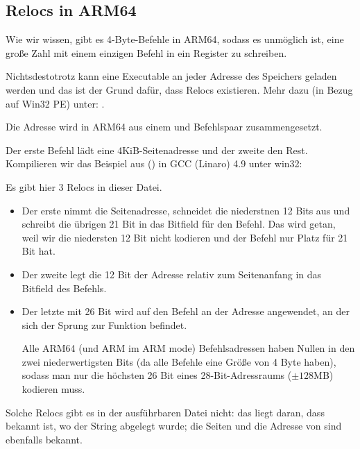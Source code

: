 \newcommand{\ARMELF}{\InSqBrackets{\emph{ELF für die ARM 64-Bit-Architektur (AArch64)}, (2013)}\footnote{\AlsoAvailableAs
\url{http://infocenter.arm.com/help/topic/com.arm.doc.ihi0056b/IHI0056B_aaelf64.pdf}}}

\subsection{Relocs in ARM64}
\label{ARM64_relocs}
Wie wir wissen, gibt es 4-Byte-Befehle in ARM64, sodass es unmöglich ist, eine große Zahl mit einem einzigen Befehl in
ein Register zu schreiben.

Nichtsdestotrotz kann eine Executable an jeder Adresse des Speichers geladen werden und das ist der Grund dafür, dass
Relocs existieren. Mehr dazu (in Bezug auf Win32 PE) unter: .

Die Adresse wird in ARM64 aus einem  und \ADD Befehlspaar zusammengesetzt.

Der erste Befehl lädt eine 4KiB-Seitenadresse und der zweite den Rest. 
Kompilieren wir das Beispiel aus \q{\HelloWorldSectionName} () in GCC (Linaro) 4.9 unter win32:



Es gibt hier 3 Relocs in dieser Datei.

\begin{itemize}
\item 
Der erste nimmt die Seitenadresse, schneidet die niederstnen 12 Bits aus und schreibt die übrigen 21 Bit in das
Bitfield für den  Befehl. Das wird getan, weil wir die niedersten 12 Bit nicht kodieren und der Befehl
 nur Platz für 21 Bit hat.

\item 
Der zweite legt die 12 Bit der Adresse relativ zum Seitenanfang in das Bitfield des \ADD Befehls.

\item 
Der letzte mit 26 Bit wird auf den Befehl an der Adresse  angewendet, an der sich der Sprung zur Funktion
\printf befindet.

Alle ARM64 (und ARM im ARM mode) Befehlsadressen haben Nullen in den zwei niederwertigsten Bits (da alle Befehle eine
Größe von 4 Byte haben), sodass man nur die höchsten 26 Bit eines 28-Bit-Adressraums ($\pm 128$MB) kodieren muss.

\end{itemize}
Solche Relocs gibt es in der ausführbaren Datei nicht: das liegt daran, dass bekannt ist, wo der  String
abgelegt wurde; die Seiten und die Adresse von \puts sind ebenfalls bekannt.

